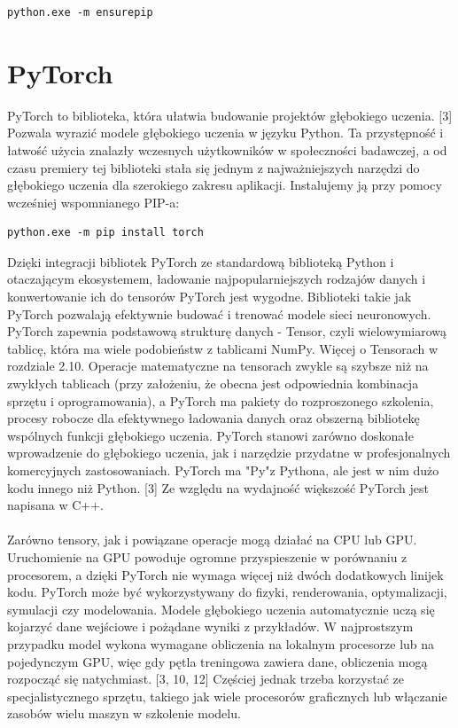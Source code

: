 \documentclass[openright]{xmgr}
\begin{document}
\begin{lstlisting}
python.exe -m ensurepip
\end{lstlisting}


 

    \section{PyTorch\label{s:dsssl}}
    
    
\indent \indent PyTorch to biblioteka, która ułatwia budowanie projektów głębokiego uczenia. [3] Pozwala wyrazić modele głębokiego uczenia w języku Python. Ta przystępność i łatwość użycia znalazły wczesnych użytkowników w społeczności badawczej, a od czasu premiery tej biblioteki stała się jednym z najważniejszych narzędzi do głębokiego uczenia dla szerokiego zakresu aplikacji. Instalujemy ją przy pomocy wcześniej wspomnianego PIP-a:

\begin{lstlisting}
python.exe -m pip install torch
\end{lstlisting}


Dzięki integracji bibliotek PyTorch ze standardową biblioteką Python i otaczającym ekosystemem, ładowanie najpopularniejszych rodzajów danych i konwertowanie ich do tensorów PyTorch jest wygodne.􏰹Biblioteki takie jak PyTorch pozwalają efektywnie budować i trenować modele sieci neuronowych. PyTorch zapewnia podstawową strukturę danych - Tensor, czyli wielowymiarową tablicę, która ma wiele podobieństw z tablicami NumPy. Więcej o Tensorach w rozdziale 2.10. Operacje matematyczne na tensorach zwykle są szybsze niż na zwykłych tablicach (przy założeniu, że obecna jest odpowiednia kombinacja sprzętu i oprogramowania), a PyTorch ma pakiety do rozproszonego szkolenia, procesy robocze dla efektywnego ładowania danych oraz obszerną bibliotekę wspólnych funkcji głębokiego uczenia. PyTorch stanowi zarówno doskonałe wprowadzenie do głębokiego uczenia, jak i narzędzie przydatne w profesjonalnych komercyjnych zastosowaniach. PyTorch ma "Py"z Pythona, ale jest w nim dużo kodu innego niż Python. [3] Ze względu na wydajność większość PyTorch jest napisana w C++. \\
\\
\indent \indent Zarówno tensory, jak i powiązane operacje mogą działać na CPU lub GPU. Uruchomienie na GPU powoduje ogromne przyspieszenie w porównaniu z procesorem, a dzięki PyTorch nie wymaga więcej niż dwóch dodatkowych linijek kodu. PyTorch może być wykorzystywany do fizyki, renderowania, optymalizacji, symulacji czy modelowania. Modele głębokiego uczenia automatycznie uczą się kojarzyć dane wejściowe i pożądane wyniki z przykładów. W najprostszym przypadku model wykona wymagane obliczenia na lokalnym procesorze lub na pojedynczym GPU, więc gdy pętla treningowa zawiera dane, obliczenia mogą rozpocząć się natychmiast. [3, 10, 12] Częściej jednak trzeba korzystać ze specjalistycznego sprzętu, takiego jak wiele procesorów graficznych lub włączanie zasobów wielu maszyn w szkolenie modelu.
\end{document}
